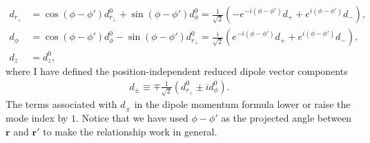 \documentclass[]{report}
\begin{document}
\begin{align}
d_{r\!_\perp}\! &= \cos(\phi\!-\!\phi')d^0_{r\!_\perp}\!\!+\!\sin(\phi\!-\!\phi')d^0_\phi=\frac{1}{\sqrt{2}}\left(-e^{-i(\phi\!-\!\phi')}d_++e^{i(\phi\!-\!\phi')}d_- \right),\\
d_\phi &=\cos(\phi\!-\!\phi')d^0_\phi\!-\!\sin(\phi\!-\!\phi')d^0_{r\!_\perp}=\frac{i}{\sqrt{2}}\left(e^{-i(\phi\!-\!\phi')}d_++e^{i(\phi\!-\!\phi')}d_- \right),\\
d_z &= d^0_z,
\end{align}
where I have defined the position-independent reduced dipole vector components
\begin{align}
d_\pm \equiv \mp \frac{1}{\sqrt{2}}(d^0_{r\!_\perp}\pm id^0_{\phi}).
\end{align}
The terms associated with $d_\pm$ in the dipole momentum formula lower or raise the mode index by $1$. Notice that we have used $\phi\!-\!\phi'$ as the projected angle between $\mathbf{r}$ and $\mathbf{r}'$ to make the relationship work in general. 
\end{document}
